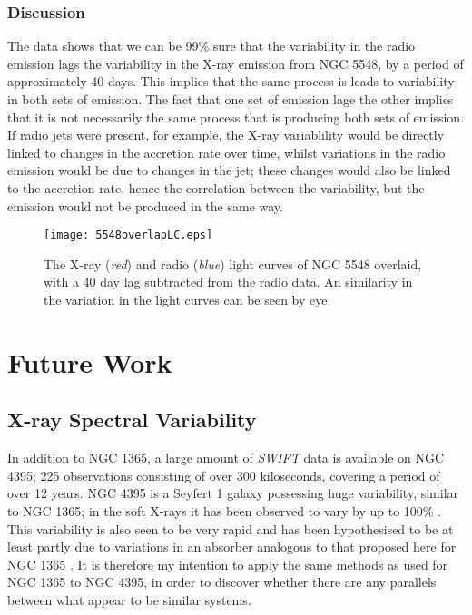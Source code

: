 \documentclass[letters,useAMS,usenatbib]{samnote}
\begin{document}
 \subsubsection{Discussion}
 
 The data shows that we can be 99\% sure that the variability in the radio emission lags the variability in the X-ray emission from NGC 5548, by a period of
approximately 40 days. This implies that the same process is leads to variability in both sets of emission. The fact that one set of emission lage the other implies that
it is not necessarily the same process that is producing both sets of emission. If radio jets were present, for example, the X-ray variablility would be directly linked
to changes in the accretion rate over time, whilst variations in the radio emission would be due to changes in the jet; these changes would also be linked to the
accretion rate, hence the correlation between the variability, but the emission would not be produced in the same way.
 

 
\begin{figure}
	
	\texttt{[image: 5548overlapLC.eps]}\hspace{1pt}
	\caption{The X-ray  ({\it red}) and radio  ({\it blue}) light curves of NGC 5548 overlaid, with a 40 day lag subtracted from the radio data. An similarity in the
variation in the light curves can be seen by eye.}
	
	\label{twoLCs}
\end{figure}  
 

\section{Future Work}

\subsection{X-ray Spectral Variability}

In addition to NGC 1365, a large amount of {\it SWIFT} data is available on NGC 4395; 225 observations consisting of over 300 kiloseconds, covering a period of over 12
years. NGC 4395 is a Seyfert 1 galaxy possessing huge variability, similar to NGC 1365; in the soft X-rays it has been observed to vary by up to 100\% \citep{vaughan05}.
This variability is also seen to be very rapid and has been hypothesised to be at least partly due to variations in an absorber analogous to that proposed here for NGC
1365 \citep{iwasawa00}. It is therefore my intention to apply the same methods as used for NGC 1365 to NGC 4395, in order to discover whether there are any parallels
between what appear to be similar systems.
\end{document}
